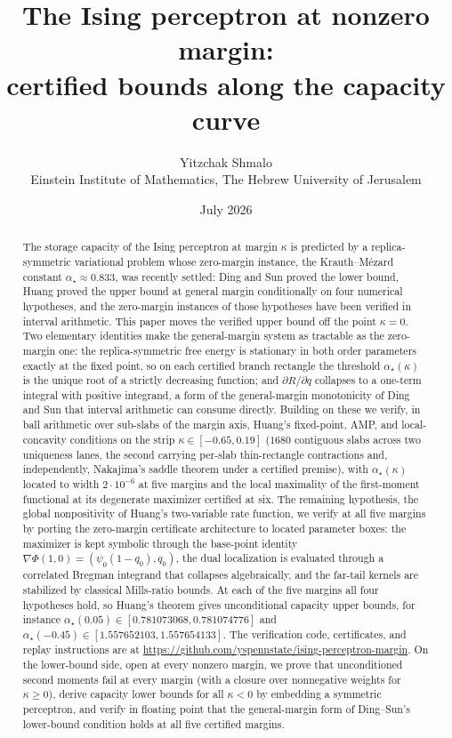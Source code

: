 \documentclass[11pt]{article}
\title{The Ising perceptron at nonzero margin:\\
certified bounds along the capacity curve}
\author{Yitzchak Shmalo\\
\small Einstein Institute of Mathematics, The Hebrew University of Jerusalem\\
\small }
\date{July 2026}
\theoremstyle{remark}
\begin{document}
\maketitle

\begin{abstract}
The storage capacity of the Ising perceptron at margin $\kappa$ is
predicted by a replica-symmetric variational problem whose zero-margin
instance, the Krauth--M\'ezard constant $\alpha_\star\approx 0.833$, was
recently settled: Ding and Sun proved the lower bound, Huang proved the
upper bound at general margin conditionally on four numerical
hypotheses, and the zero-margin instances of those hypotheses have been
verified in interval arithmetic.  This paper moves the verified upper
bound off the point $\kappa=0$.  Two elementary identities make the
general-margin system as tractable as the zero-margin one: the
replica-symmetric free energy is stationary in both order parameters
exactly at the fixed point, so on each certified branch rectangle
the threshold $\alpha_\star(\kappa)$ is the unique root of a strictly
decreasing function; and $\partial R/\partial q$ collapses to a
one-term integral with positive integrand, a form of the
general-margin monotonicity of Ding and Sun that interval arithmetic
can consume directly.  Building on these we verify, in ball arithmetic over
sub-slabs of the margin axis, Huang's fixed-point, AMP, and
local-concavity conditions on the strip $\kappa\in[-0.65,0.19]$
($1680$ contiguous slabs across two uniqueness lanes, the second
carrying per-slab thin-rectangle contractions and, independently,
Nakajima's saddle theorem under a certified premise), with
$\alpha_\star(\kappa)$ located to width $2\cdot10^{-6}$ at five
margins and the local maximality of the first-moment functional at its
degenerate maximizer certified at six.  The remaining hypothesis, the
global nonpositivity of Huang's two-variable rate function, we verify
at all five margins by porting the zero-margin certificate
architecture to located parameter boxes: the maximizer is kept
symbolic through the base-point identity
$\nabla\Phi(1,0)=(\psi_0(1-q_0),q_0)$, the dual localization is
evaluated through a correlated Bregman integrand that collapses
algebraically, and the far-tail kernels are stabilized by classical
Mills-ratio bounds.  At each of the five margins all four hypotheses hold,
so Huang's theorem gives unconditional capacity upper bounds, for
instance $\alpha_\star(0.05)\in[0.781073068,0.781074776]$ and
$\alpha_\star(-0.45)\in[1.557652103,1.557654133]$.  The verification
code, certificates, and replay instructions are at
\url{https://github.com/yspennstate/ising-perceptron-margin}.
  On the lower-bound side, open at every nonzero
margin, we prove that unconditioned second moments fail at every
margin (with a closure over nonnegative weights for
$\kappa\ge0$), derive capacity lower bounds for all $\kappa<0$ by
embedding a symmetric perceptron, and verify in floating point that
the general-margin form of Ding--Sun's lower-bound condition holds
at all five certified margins.
\end{abstract}
\end{document}
